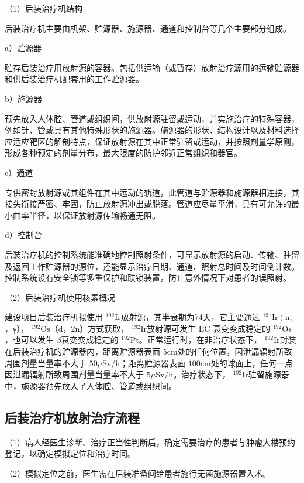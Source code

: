 （1）后装治疗机结构

后装治疗机主要由机架、贮源器、施源器、通道和控制台等几个主要部分组成。

a）贮源器

贮存后装治疗用放射源的容器。包括供运输（或暂存）放射治疗源用的运输贮源器和供后装治疗机配套用的工作贮源器。

b）施源器

预先放入人体腔、管道或组织间，供放射源驻留或运动，并实施治疗的特殊容器，例如针、管或具有其他特殊形状的施源器。施源器的形状、结构设计以及材料选择应适应靶区的解剖特点，保证放射源在其中正常驻留或运动，并按照剂量学原则，形成各种预定的剂量分布，最大限度的防护邻近正常组织和器官。

c）通道

专供密封放射源或其组件在其中运动的轨道，此管道与贮源器和施源器相连接，其接头衔接严密、牢固，防止放射源冲出或脱落。管道应尽量平滑，具有可允许的最小曲率半径，以保证放射源传输畅通无阻。

d）控制台

后装治疗机的控制系统能准确地控制照射条件，可显示放射源的启动、传输、驻留及返回工作贮源器的源位，还能显示治疗日期、通道、照射总时间及时间倒计数。控制系统设有安全锁等多重保护和联锁装置，防止意外情况下对患者的误照射。

（2）后装治疗机使用核素概况

建设项目后装治疗机拟使用 $^ { 1 9 2 } \mathrm { I r }$放射源，其半衰期为74天，它主要通过 $^ { 1 9 1 } \mathrm { I r } \left( \mathrm { n } , \right.$，γ）， $^ { 1 9 2 } \mathrm { O s }$（d，2n）方式获取， $^ { 1 9 2 } \mathrm { I r }$放射源可发生 EC 衰变变成稳定的 $^ { 1 9 2 } \mathrm { O s }$，也可以发生 $\beta$衰变变成稳定的 $^ { 1 9 2 } \mathrm { { P t } }$。正常运行时，在非治疗状态下， $^ { 1 9 2 } \mathrm { I r }$封装在后装治疗机的贮源器内，距离贮源器表面 $5 \mathrm { c m }$处的任何位置，因泄漏辐射所致周围剂量当量率不大于 $5 0 \mu \mathrm { S v / h }$；距离贮源器表面 $1 0 0 \mathrm { c m }$处的球面上，任何一点因泄漏辐射所致周围剂量当量率不大于 $5 \mu \mathrm { S v / h }$。治疗状态下， $^ { 1 9 2 } \mathrm { I r }$驻留施源器中，施源器预先放入了人体腔、管道或组织间。

\subsection{后装治疗机放射治疗流程}

（1）病人经医生诊断、治疗正当性判断后，确定需要治疗的患者与肿瘤大楼预约登记，以确定模拟定位和治疗时间。

（2）模拟定位之前，医生需在后装准备间给患者施行无菌施源器置入术。

